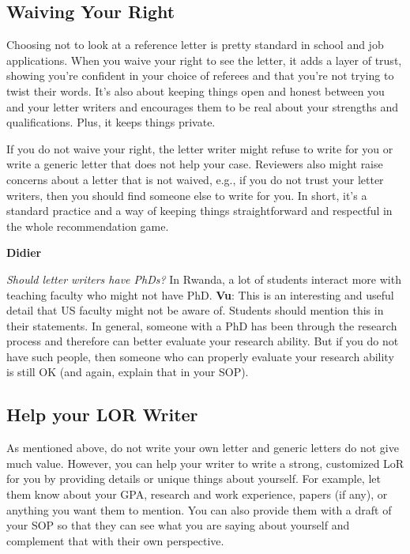 \documentclass[oneside,11pt,dvipsnames]{book}
\newenvironment{commentbox}[1][]{
  \small
  \begin{mybox}
    {\small \textbf{#1}}
  }{
  \end{mybox}
}
\begin{document}
\subsection{Waiving Your Right}  Choosing not to look at a reference letter is pretty standard in school and job applications. When you waive your right to see the letter, it adds a layer of trust, showing you're confident in your choice of referees and that you're not trying to twist their words. It's also about keeping things open and honest between you and your letter writers and encourages them to be real about your strengths and qualifications. Plus, it keeps things private.

If you do not waive your right,  the letter writer might refuse to write for you or write a generic letter that does not help your case.  Reviewers also might raise concerns about a letter that is not waived, e.g., if you do not trust your letter writers, then you should find someone else to write for you. In short, it's a standard practice and a way of keeping things straightforward and respectful in the whole recommendation game.

\begin{commentbox}[Didier]
  \emph{Should letter writers have PhDs?}  In Rwanda, a lot of students interact more with teaching faculty who might not have PhD.
  \tcblower
  \textbf{Vu}: This is an interesting and useful detail that US faculty might not be aware of. Students should mention this in their statements. In general, someone with a PhD has been through the research process and therefore can better evaluate your research ability.  But if you do not have such people, then someone who can properly evaluate your research ability is still OK (and again, explain that in your SOP).
\end{commentbox}


\subsection{Help your LOR Writer} As mentioned above, do not write your own letter and generic letters do not give much value. However, you can help your writer to write a strong, customized LoR for you by providing details or unique things about yourself. For example, let them know about your GPA, research and work experience, papers (if any), or anything you want them to mention. You can also provide them with a draft of your SOP so that they can see what you are saying about yourself and complement that with their own perspective.
\end{document}
